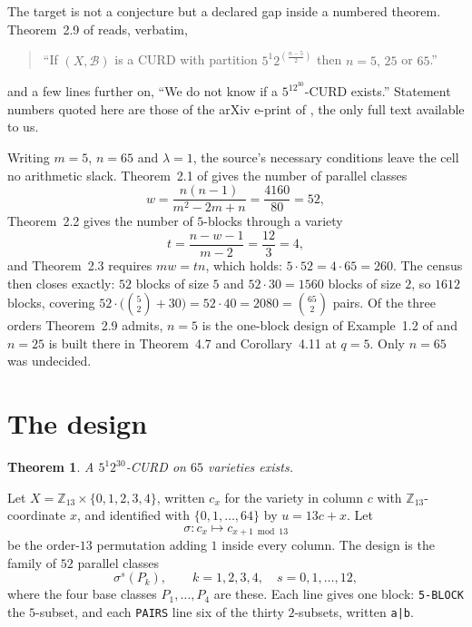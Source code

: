 \documentclass[11pt]{amsart}
\newtheorem{theorem}{Theorem}
\theoremstyle{remark}
\begin{document}
The target is not a conjecture but a declared gap inside a numbered theorem.
Theorem~2.9 of \cite{CDRT} reads, verbatim,
\begin{quote}
``If $(X,\mathcal B)$ is a CURD with partition $5^1 2^{(\frac{n-5}{2})}$ then
$n=5,\,25$ or $65$.''
\end{quote}
and a few lines further on, ``We do not know if a $5^12^{30}$-CURD exists.''
Statement numbers quoted here are those of the arXiv e-print of \cite{CDRT},
the only full text available to us.

Writing $m=5$, $n=65$ and $\lambda=1$, the source's necessary conditions leave
the cell no arithmetic slack. Theorem~2.1 of \cite{CDRT} gives the number of
parallel classes
\[
 w=\frac{n(n-1)}{m^2-2m+n}=\frac{4160}{80}=52,
\]
Theorem~2.2 gives the number of $5$-blocks through a variety
\[
 t=\frac{n-w-1}{m-2}=\frac{12}{3}=4,
\]
and Theorem~2.3 requires $mw=tn$, which holds: $5\cdot52=4\cdot65=260$. The
census then closes exactly: $52$ blocks of size $5$ and $52\cdot30=1560$ blocks
of size $2$, so $1612$ blocks, covering
$52\cdot\bigl(\binom52+30\bigr)=52\cdot40=2080=\binom{65}2$ pairs. Of the three
orders Theorem~2.9 admits, $n=5$ is the one-block design of Example~1.2 of
\cite{CDRT} and $n=25$ is built there in Theorem~4.7 and Corollary~4.11 at
$q=5$. Only $n=65$ was undecided.

\section{The design}

\begin{theorem}\label{thm:main}
A $5^1 2^{30}$-CURD on $65$ varieties exists.
\end{theorem}

Let $X=\mathbb Z_{13}\times\{0,1,2,3,4\}$, written $c_x$ for the variety in
column $c$ with $\mathbb Z_{13}$-coordinate $x$, and identified with
$\{0,1,\dots,64\}$ by $u=13c+x$. Let
\[
 \sigma\colon c_x\longmapsto c_{x+1\bmod13}
\]
be the order-$13$ permutation adding $1$ inside every column. The design is the
family of $52$ parallel classes
\[
 \sigma^{s}(P_k),\qquad k=1,2,3,4,\quad s=0,1,\dots,12,
\]
where the four base classes $P_1,\dots,P_4$ are these. Each line gives one
block: \texttt{5-BLOCK} the $5$-subset, and each \texttt{PAIRS} line six of the
thirty $2$-subsets, written \texttt{a|b}.
\end{document}
